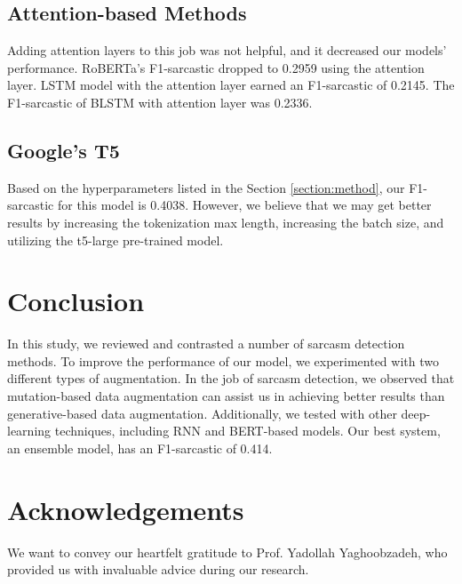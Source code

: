 \documentclass[11pt]{article}
\begin{document}
\subsection{Attention-based Methods}
Adding attention layers to this job was not helpful, and it decreased our models' performance. RoBERTa's F1-sarcastic dropped to 0.2959 using the attention layer. LSTM model with the attention layer earned an F1-sarcastic of 0.2145. The F1-sarcastic of BLSTM with attention layer was 0.2336.

\subsection{Google's T5}
Based on the hyperparameters listed in the Section \ref{section:method}, our F1-sarcastic for this model is 0.4038. However, we believe that we may get better results by increasing the tokenization max length, increasing the batch size, and utilizing the t5-large pre-trained model.

\section{Conclusion}
In this study, we reviewed and contrasted a number of sarcasm detection methods. To improve the performance of our model, we experimented with two different types of augmentation. In the job of sarcasm detection, we observed that mutation-based data augmentation can assist us in achieving better results than generative-based data augmentation. Additionally, we tested with other deep-learning techniques, including RNN and BERT-based models. Our best system, an ensemble model, has an F1-sarcastic of 0.414.

\section*{Acknowledgements}
We want to convey our heartfelt gratitude to Prof. Yadollah Yaghoobzadeh, who provided us with invaluable advice during our research.



\appendix
\end{document}
